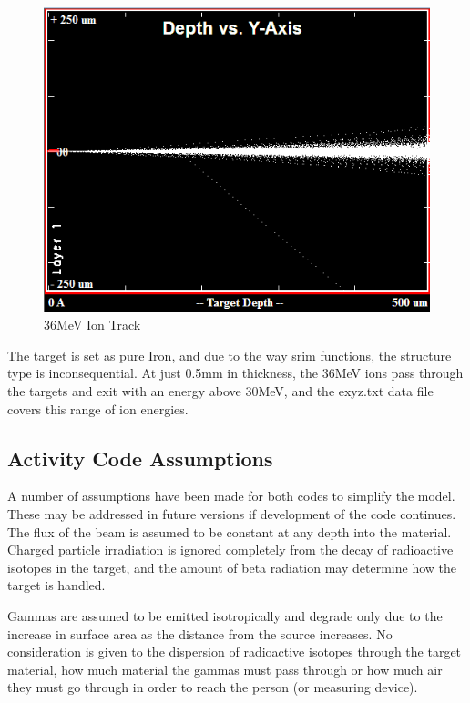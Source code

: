 \begin{figure}[htp]
  \begin{center}
    \includegraphics[scale=0.55]{chapters/activity_code/images/ion_transport.png}
    \caption{36MeV Ion Track}
    \label{graph:graph1}
  \end{center}
\end{figure}

The target is set as pure Iron, and due to the way \acrshort{srim} functions, the structure type is inconsequential.  At just 0.5mm in thickness, the 36MeV ions pass through the targets and exit with an energy above 30MeV, and the exyz.txt data file covers this range of ion energies.


\subsection{Activity Code Assumptions}

A number of assumptions have been made for both codes to simplify the model.  These may be addressed in future versions if development of the code continues.  The flux of the beam is assumed to be constant at any depth into the material.  Charged particle irradiation is ignored completely from the decay of radioactive isotopes in the target, and the amount of beta radiation may determine how the target is handled.

Gammas are assumed to be emitted isotropically and degrade only due to the increase in surface area as the distance from the source increases.  No consideration is given to the dispersion of radioactive isotopes through the target material, how much material the gammas must pass through or how much air they must go through in order to reach the person (or measuring device).

